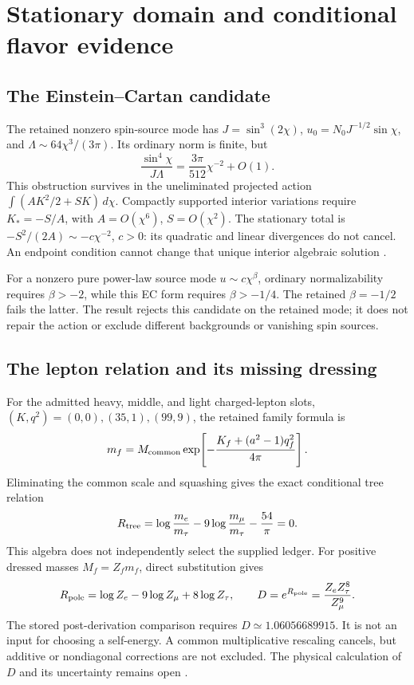 \documentclass[11pt]{article}
\begin{document}
\section{Stationary domain and conditional flavor evidence}
\subsection{The Einstein--Cartan candidate}
The retained nonzero spin-source mode has
\(J=\sin^3(2\chi)\), \(u_0=N_0J^{-1/2}\sin\chi\), and
\(\Lambda\sim64\chi^3/(3\pi)\). Its ordinary norm is finite, but
\begin{equation}
 \frac{\sin^4\chi}{J\Lambda}
 =\frac{3\pi}{512}\chi^{-2}+O(1).
\end{equation}
This obstruction survives in the uneliminated projected action
\(\int(AK^2/2+SK)\,d\chi\). Compactly supported interior variations
require \(K_*=-S/A\), with \(A=O(\chi^6)\), \(S=O(\chi^2)\).
The stationary total is \(-S^2/(2A)\sim-c\chi^{-2}\), \(c>0\): its quadratic
and linear divergences do not cancel. An endpoint condition cannot change
that unique interior algebraic solution \cite{dependencyaudit}.

For a nonzero pure power-law source mode \(u\sim c\chi^\beta\),
ordinary normalizability requires \(\beta>-2\), while this EC form
requires \(\beta>-1/4\). The retained \(\beta=-1/2\) fails the latter.
The result rejects this candidate on the retained mode; it does not repair
the action or exclude different backgrounds or vanishing spin sources.

\subsection{The lepton relation and its missing dressing}
For the admitted heavy, middle, and light charged-lepton slots,
\((K,q^2)=(0,0),(35,1),(99,9)\), the retained family formula is
\begin{equation}
 m_f=M_{\rm common}\exp\!\left[-\frac{K_f+(a^2-1)q_f^2}{4\pi}\right].
\end{equation}
Eliminating the common scale and squashing gives the exact conditional
tree relation
\begin{equation}
 R_{\rm tree}=\log\frac{m_e}{m_\tau}
             -9\log\frac{m_\mu}{m_\tau}-\frac{54}{\pi}=0.
\end{equation}
This algebra does not independently select the supplied ledger.
For positive dressed masses \(M_f=Z_fm_f\), direct substitution gives
\begin{equation}
 R_{\rm pole}=\log Z_e-9\log Z_\mu+8\log Z_\tau,
 \qquad D=e^{R_{\rm pole}}=\frac{Z_eZ_\tau^8}{Z_\mu^9}.
\end{equation}
The stored post-derivation comparison requires \(D\simeq1.06056689915\).
It is not an input for choosing a self-energy. A common multiplicative
rescaling cancels, but additive or nondiagonal corrections are not excluded.
The physical calculation of \(D\) and its uncertainty remains open
\cite{dependencyaudit}.
\end{document}
